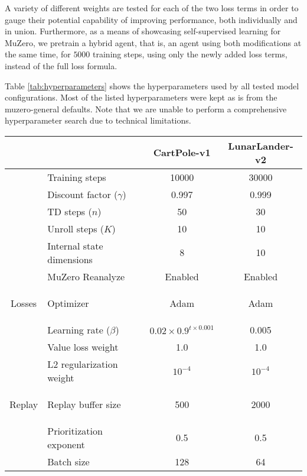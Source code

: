 A variety of different weights are tested for each of the two loss terms in order to gauge their potential capability of improving performance, both individually and in union. Furthermore, as a means of showcasing self-supervised learning for MuZero, we pretrain a hybrid agent, that is, an agent using both modifications at the same time, for $5000$ training steps, using only the newly added loss terms, instead of the full loss formula.

Table \ref{tab:hyperparameters} shows the hyperparameters used by all tested model configurations. Most of the listed hyperparameters were kept as is from the muzero-general defaults. Note that we are unable to perform a comprehensive hyperparameter search due to technical limitations.
\begin{table}[ht]
    \centering
    \begin{tabular}{|c|l||c|c|}
        \hline
        & & CartPole-v1 & LunarLander-v2 \\
        \hline\hline

        & Training steps & 10000 & 30000 \\
        \cline{2-4}
        & Discount factor ($\gamma$) & 0.997 & 0.999 \\
        \cline{2-4}
        & TD steps ($n$) & 50 & 30 \\
        \cline{2-4}
        & Unroll steps ($K$) & 10 & 10 \\
        \cline{2-4}
        & Internal state dimensions & 8 & 10 \\
        \cline{2-4}
        & MuZero Reanalyze & Enabled & Enabled \\

        \hline

        \multirow{4.1}{*}{\begin{sideways}Losses\end{sideways}} & Optimizer & Adam & Adam \\
        \cline{2-4}
        & Learning rate ($\beta$) & $0.02 \times 0.9^{t \times 0.001}$ & 0.005 \\
        \cline{2-4}
        & Value loss weight & 1.0 & 1.0 \\
        \cline{2-4}
        & L2 regularization weight & $10^{-4}$ & $10^{-4}$ \\

        \hline

        \multirow{3.2}{*}{\begin{sideways}Replay\end{sideways}} & Replay buffer size & 500 & 2000 \\
        \cline{2-4}
        & Prioritization exponent & 0.5 & 0.5 \\
        \cline{2-4}
        & Batch size & 128 & 64 \\


\end{tabular}
\end{table}
